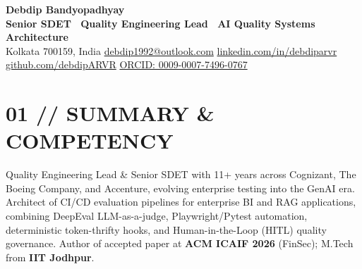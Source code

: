 \documentclass[10pt,a4paper]{article}
\begin{document}
\color{metroink}

\noindent
{\fontsize{20pt}{22pt}\selectfont \textbf{Debdip Bandyopadhyay}}\\[2pt]
{\fontsize{9.2pt}{11pt}\selectfont \textcolor{zuneorange}{\textbf{Senior SDET \textbar\ Quality Engineering Lead \textbar\ AI Quality Systems Architecture}}}\\[2.5pt]
{\fontsize{8pt}{10pt}\selectfont \textcolor{metroslate}{
Kolkata 700159, India \enspace\textbar\enspace \href{mailto:debdip1992@outlook.com}{debdip1992@outlook.com} \enspace\textbar\enspace \href{https://linkedin.com/in/debdiparvr}{linkedin.com/in/debdiparvr} \enspace\textbar\enspace \href{https://github.com/debdipARVR}{github.com/debdipARVR} \enspace\textbar\enspace \href{https://orcid.org/0009-0007-7496-0767}{ORCID: 0009-0007-7496-0767}
}}
\vspace{-2pt}

\section*{01 // SUMMARY \& COMPETENCY}
\small
Quality Engineering Lead \& Senior SDET with 11+ years across Cognizant, The Boeing Company, and Accenture, evolving enterprise testing into the GenAI era. Architect of CI/CD evaluation pipelines for enterprise BI and RAG applications, combining DeepEval LLM-as-a-judge, Playwright/Pytest automation, deterministic token-thrifty hooks, and Human-in-the-Loop (HITL) quality governance. Author of accepted paper at \textbf{ACM ICAIF 2026} (FinSec); M.Tech from \textbf{IIT Jodhpur}.

\end{document}
